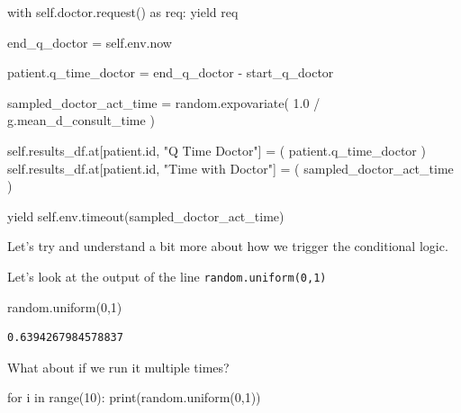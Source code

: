 \documentclass[
  letterpaper,
  DIV=11,
  numbers=noendperiod]{scrreprt}
\newenvironment{Shaded}{\begin{snugshade}}{\end{snugshade}}
\newcommand{\BuiltInTok}[1]{\textcolor[rgb]{0.00,0.23,0.31}{#1}}
\newcommand{\ControlFlowTok}[1]{\textcolor[rgb]{0.00,0.23,0.31}{#1}}
\newcommand{\DecValTok}[1]{\textcolor[rgb]{0.68,0.00,0.00}{#1}}
\newcommand{\FloatTok}[1]{\textcolor[rgb]{0.68,0.00,0.00}{#1}}
\newcommand{\ImportTok}[1]{\textcolor[rgb]{0.00,0.46,0.62}{#1}}
\newcommand{\KeywordTok}[1]{\textcolor[rgb]{0.00,0.23,0.31}{#1}}
\newcommand{\NormalTok}[1]{\textcolor[rgb]{0.00,0.23,0.31}{#1}}
\newcommand{\OperatorTok}[1]{\textcolor[rgb]{0.37,0.37,0.37}{#1}}
\newcommand{\StringTok}[1]{\textcolor[rgb]{0.13,0.47,0.30}{#1}}
\newcommand{\VariableTok}[1]{\textcolor[rgb]{0.07,0.07,0.07}{#1}}
\begin{document}
\begin{Shaded}
\begin{Highlighting}[]
            \ControlFlowTok{with} \VariableTok{self}\NormalTok{.doctor.request() }\ImportTok{as}\NormalTok{ req:}
                \ControlFlowTok{yield}\NormalTok{ req}

\NormalTok{                end\_q\_doctor }\OperatorTok{=} \VariableTok{self}\NormalTok{.env.now}

\NormalTok{                patient.q\_time\_doctor }\OperatorTok{=}\NormalTok{ end\_q\_doctor }\OperatorTok{{-}}\NormalTok{ start\_q\_doctor}

\NormalTok{                sampled\_doctor\_act\_time }\OperatorTok{=}\NormalTok{ random.expovariate(}
                    \FloatTok{1.0} \OperatorTok{/}\NormalTok{ g.mean\_d\_consult\_time}
\NormalTok{                )}

                \VariableTok{self}\NormalTok{.results\_df.at[patient.}\BuiltInTok{id}\NormalTok{, }\StringTok{"Q Time Doctor"}\NormalTok{] }\OperatorTok{=}\NormalTok{ (}
\NormalTok{                    patient.q\_time\_doctor}
\NormalTok{                )}
                \VariableTok{self}\NormalTok{.results\_df.at[patient.}\BuiltInTok{id}\NormalTok{, }\StringTok{"Time with Doctor"}\NormalTok{] }\OperatorTok{=}\NormalTok{ (}
\NormalTok{                    sampled\_doctor\_act\_time}
\NormalTok{                )}

                \ControlFlowTok{yield} \VariableTok{self}\NormalTok{.env.timeout(sampled\_doctor\_act\_time)}
\end{Highlighting}
\end{Shaded}

Let's try and understand a bit more about how we trigger the conditional
logic.

Let's look at the output of the line \texttt{random.uniform(0,1)}

\begin{Shaded}
\begin{Highlighting}[]
\NormalTok{random.uniform(}\DecValTok{0}\NormalTok{,}\DecValTok{1}\NormalTok{)}
\end{Highlighting}
\end{Shaded}

\begin{verbatim}
0.6394267984578837
\end{verbatim}

What about if we run it multiple times?

\begin{Shaded}
\begin{Highlighting}[]
\ControlFlowTok{for}\NormalTok{ i }\KeywordTok{in} \BuiltInTok{range}\NormalTok{(}\DecValTok{10}\NormalTok{):}
  \BuiltInTok{print}\NormalTok{(random.uniform(}\DecValTok{0}\NormalTok{,}\DecValTok{1}\NormalTok{))}
\end{Highlighting}
\end{Shaded}
\end{document}
